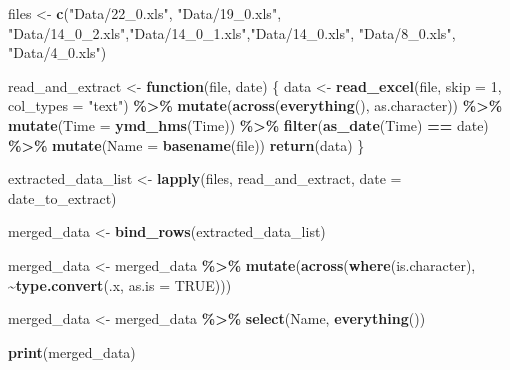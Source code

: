 \documentclass[
]{article}
\newenvironment{Shaded}{\begin{snugshade}}{\end{snugshade}}
\newcommand{\AttributeTok}[1]{\textcolor[rgb]{0.13,0.29,0.53}{#1}}
\newcommand{\ConstantTok}[1]{\textcolor[rgb]{0.56,0.35,0.01}{#1}}
\newcommand{\ControlFlowTok}[1]{\textcolor[rgb]{0.13,0.29,0.53}{\textbf{#1}}}
\newcommand{\DecValTok}[1]{\textcolor[rgb]{0.00,0.00,0.81}{#1}}
\newcommand{\FunctionTok}[1]{\textcolor[rgb]{0.13,0.29,0.53}{\textbf{#1}}}
\newcommand{\NormalTok}[1]{#1}
\newcommand{\OtherTok}[1]{\textcolor[rgb]{0.56,0.35,0.01}{#1}}
\newcommand{\SpecialCharTok}[1]{\textcolor[rgb]{0.81,0.36,0.00}{\textbf{#1}}}
\newcommand{\StringTok}[1]{\textcolor[rgb]{0.31,0.60,0.02}{#1}}
\begin{document}
\begin{Shaded}
\begin{Highlighting}[]
\NormalTok{files }\OtherTok{\textless{}{-}} \FunctionTok{c}\NormalTok{(}\StringTok{"Data/22\_0.xls"}\NormalTok{, }\StringTok{"Data/19\_0.xls"}\NormalTok{, }\StringTok{"Data/14\_0\_2.xls"}\NormalTok{,}\StringTok{"Data/14\_0\_1.xls"}\NormalTok{,}\StringTok{"Data/14\_0.xls"}\NormalTok{, }\StringTok{"Data/8\_0.xls"}\NormalTok{, }\StringTok{"Data/4\_0.xls"}\NormalTok{)}


\NormalTok{read\_and\_extract }\OtherTok{\textless{}{-}} \ControlFlowTok{function}\NormalTok{(file, date) \{}
\NormalTok{  data }\OtherTok{\textless{}{-}} \FunctionTok{read\_excel}\NormalTok{(file, }\AttributeTok{skip =} \DecValTok{1}\NormalTok{, }\AttributeTok{col\_types =} \StringTok{"text"}\NormalTok{) }\SpecialCharTok{\%\textgreater{}\%} 
    \FunctionTok{mutate}\NormalTok{(}\FunctionTok{across}\NormalTok{(}\FunctionTok{everything}\NormalTok{(), as.character)) }\SpecialCharTok{\%\textgreater{}\%}
    \FunctionTok{mutate}\NormalTok{(}\AttributeTok{Time =} \FunctionTok{ymd\_hms}\NormalTok{(Time)) }\SpecialCharTok{\%\textgreater{}\%}
    \FunctionTok{filter}\NormalTok{(}\FunctionTok{as\_date}\NormalTok{(Time) }\SpecialCharTok{==}\NormalTok{ date) }\SpecialCharTok{\%\textgreater{}\%}
    \FunctionTok{mutate}\NormalTok{(}\AttributeTok{Name =} \FunctionTok{basename}\NormalTok{(file)) }
  \FunctionTok{return}\NormalTok{(data)}
\NormalTok{\}}


\NormalTok{extracted\_data\_list }\OtherTok{\textless{}{-}} \FunctionTok{lapply}\NormalTok{(files, read\_and\_extract, }\AttributeTok{date =}\NormalTok{ date\_to\_extract)}


\NormalTok{merged\_data }\OtherTok{\textless{}{-}} \FunctionTok{bind\_rows}\NormalTok{(extracted\_data\_list)}


\NormalTok{merged\_data }\OtherTok{\textless{}{-}}\NormalTok{ merged\_data }\SpecialCharTok{\%\textgreater{}\%}
  \FunctionTok{mutate}\NormalTok{(}\FunctionTok{across}\NormalTok{(}\FunctionTok{where}\NormalTok{(is.character), }\SpecialCharTok{\textasciitilde{}}\FunctionTok{type.convert}\NormalTok{(.x, }\AttributeTok{as.is =} \ConstantTok{TRUE}\NormalTok{)))}


\NormalTok{merged\_data }\OtherTok{\textless{}{-}}\NormalTok{ merged\_data }\SpecialCharTok{\%\textgreater{}\%} \FunctionTok{select}\NormalTok{(Name, }\FunctionTok{everything}\NormalTok{())}


\FunctionTok{print}\NormalTok{(merged\_data)}
\end{Highlighting}
\end{Shaded}
\end{document}
